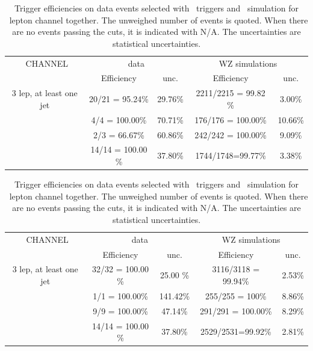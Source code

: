 \begin{table}[htbp]
	\centering
	\caption{Trigger efficiencies on data events selected with \Etmis\ triggers and \WZ\ simulation for \eee\ lepton channel together. The unweighed number of events is quoted. When there are no events passing the cuts, it is indicated with N/A. The uncertainties are statistical uncertainties.}

	\begin{tabular}{c|c|c|c|c}
		\toprule 
		\eee\ CHANNEL & \multicolumn{2}{c|}{data} & \multicolumn{2}{c}{WZ simulations} \\ 
		& Efficiency & unc. & Efficiency & unc. \\
		\midrule
		3 lep,  at least one jet & 20/21 = 95.24\%  & 29.76\% & 2211/2215 = 99.82 \% & 3.00\%  \\ 
		\hline 
		\STSR & 4/4 = 100.00\% & 70.71\% & 176/176 = 100.00\% & 10.66\% \\ 
		\hline 
		\TTSR & 2/3 = 66.67\% & 60.86\% & 242/242 = 100.00\% & 9.09\% \\ 
		\hline 
		\WZCR & 14/14 = 100.00 \% & 37.80\% & 1744/1748=99.77\% & 3.38\% \\ 
		\bottomrule
	\end{tabular} 
\end{table}
\begin{table}[htbp]
	\centering
	\caption{Trigger efficiencies on data events selected with \Etmis\ triggers and \WZ\ simulation for \eemu\ lepton channel together. The unweighed number of events is quoted. When there are no events passing the cuts, it is indicated with N/A. The uncertainties are statistical uncertainties.}

	\begin{tabular}{c|c|c|c|c}
		\toprule
		\eemu\ CHANNEL & \multicolumn{2}{c|}{data} & \multicolumn{2}{c}{WZ simulations} \\ 
		& Efficiency & unc. & Efficiency & unc. \\
		\midrule
		3 lep,  at least one jet & 32/32 = 100.00 \% & 25.00 \% & 3116/3118 = 99.94\%  & 2.53\% \\ 
		\hline 
		\STSR & 1/1 = 100.00\%& 141.42\% & 255/255 = 100\% & 8.86\% \\ 
		\hline 
		\TTSR & 9/9 = 100.00\% & 47.14\% &291/291 = 100.00\% & 8.29\% \\ 
		\hline 
		\WZCR & 14/14 = 100.00 \% & 37.80\% & 2529/2531=99.92\% & 2.81\% \\ 
		\bottomrule
	\end{tabular} 
\end{table}	

